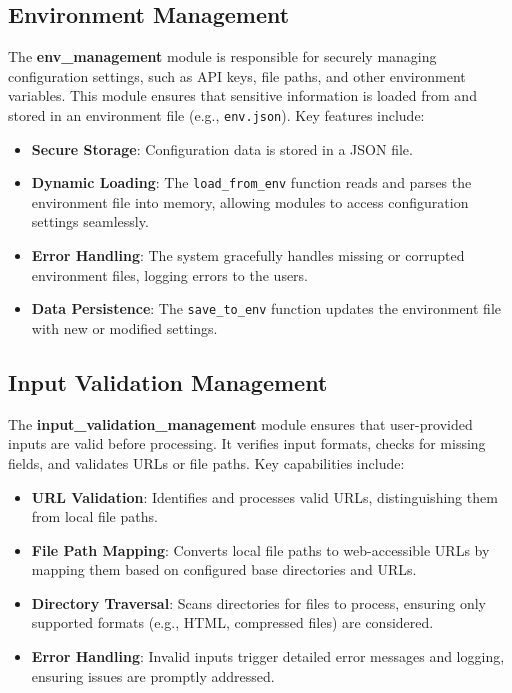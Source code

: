 \subsection{Environment Management}
\label{subsec:Environment_management}
The \textbf{env\_management} module is responsible for securely managing configuration settings, such as API keys, file paths, and other environment variables. This module ensures that sensitive information is loaded from and stored in an environment file (e.g., \texttt{env.json}). Key features include:
\begin{itemize}
    \item \textbf{Secure Storage}: Configuration data is stored in a JSON file.
    \item \textbf{Dynamic Loading}: The \texttt{load\_from\_env} function reads and parses the environment file into memory, allowing modules to access configuration settings seamlessly.
    \item \textbf{Error Handling}: The system gracefully handles missing or corrupted environment files, logging errors to the users.
    \item \textbf{Data Persistence}: The \texttt{save\_to\_env} function updates the environment file with new or modified settings.
\end{itemize}

\subsection{Input Validation Management}
\label{subsec:input_validation_management}
The \textbf{input\_validation\_management} module ensures that user-provided inputs are valid before processing. It verifies input formats, checks for missing fields, and validates URLs or file paths. Key capabilities include:
\begin{itemize}
    \item \textbf{URL Validation}: Identifies and processes valid URLs, distinguishing them from local file paths.
    \item \textbf{File Path Mapping}: Converts local file paths to web-accessible URLs by mapping them based on configured base directories and URLs.
    \item \textbf{Directory Traversal}: Scans directories for files to process, ensuring only supported formats (e.g., HTML, compressed files) are considered.
    \item \textbf{Error Handling}: Invalid inputs trigger detailed error messages and logging, ensuring issues are promptly addressed.
\end{itemize}

